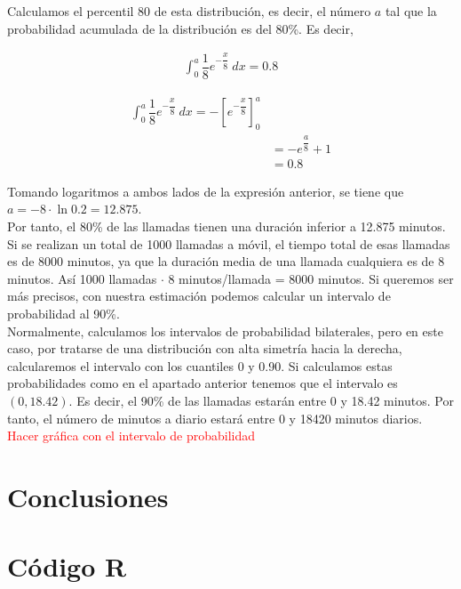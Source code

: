 \documentclass[12pt,a4paper,twoside,openright,titlepage,final]{article}
\begin{document}
Calculamos el percentil 80 de esta distribución, es decir, el número $a$ tal que la probabilidad acumulada de la distribución es del 80\%. Es decir,

\begin{align*}
\int_{0}^{a} \dfrac{1}{8} e^{-\dfrac{x}{8}} \ dx = 0.8
\end{align*}

\begin{align*}
\int_{0}^{a} \dfrac{1}{8} e^{-\dfrac{x}{8}} \ dx = - \left[ e^{-\dfrac{x}{8}} \right]_0^a \\
& = -e^{\dfrac{a}{8}} + 1 \\
& = 0.8
\end{align*}

Tomando logaritmos a ambos lados de la expresión anterior, se tiene que $a = -8 \cdot \ln 0.2 = 12.875$.\\

Por tanto, el 80\% de las llamadas tienen una duración inferior a 12.875 minutos.\\

Si se realizan un total de 1000 llamadas a móvil, el tiempo total de esas llamadas es de 8000 minutos, ya que la duración media de una llamada cualquiera es de 8 minutos. Así 1000 llamadas $\cdot$ 8 minutos/llamada = 8000 minutos. Si queremos ser más precisos, con nuestra estimación podemos calcular un intervalo de probabilidad al 90\%.\\

Normalmente, calculamos los intervalos de probabilidad bilaterales, pero en este caso, por tratarse de una distribución con alta simetría hacia la derecha, calcularemos el intervalo con los cuantiles 0 y 0.90. Si calculamos estas probabilidades como en el apartado anterior tenemos que el intervalo es $(0, 18.42)$. Es decir, el 90\% de las llamadas estarán entre 0 y 18.42 minutos. Por tanto, el número de minutos a diario estará entre 0 y 18420 minutos diarios.\\

\textcolor{red}{Hacer gráfica con el intervalo de probabilidad} 

\section{Conclusiones}
   

\newpage

\section{Código R}


\end{document}
